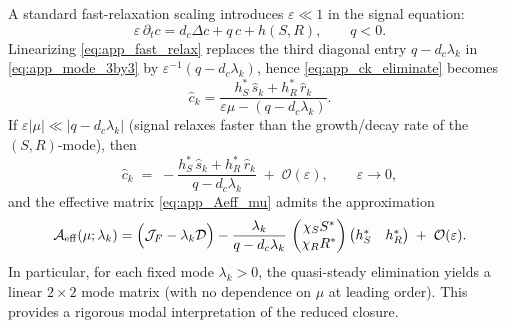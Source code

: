 \documentclass[pdflatex,sn-mathphys-ay]{sn-jnl}
\theoremstyle{thmstyleone}
\theoremstyle{definition}
\theoremstyle{remark}
\begin{document}
A standard fast-relaxation scaling introduces $\varepsilon\ll 1$ in the signal equation:
\begin{equation}
\label{eq:app_fast_relax}
\varepsilon\,\partial_t c = d_c\Delta c + q\,c + h(S,R),\qquad q<0.
\end{equation}
Linearizing \eqref{eq:app_fast_relax} replaces the third diagonal entry $q-d_c\lambda_k$ in \eqref{eq:app_mode_3by3} by
$\varepsilon^{-1}(q-d_c\lambda_k)$, hence \eqref{eq:app_ck_eliminate} becomes
\begin{equation}
\label{eq:app_ck_fast}
\hat c_k = \frac{h_S^*\,\hat s_k + h_R^*\,\hat r_k}{\varepsilon\mu-(q-d_c\lambda_k)}.
\end{equation}
If $\varepsilon|\mu|\ll |q-d_c\lambda_k|$ (signal relaxes faster than the growth/decay rate of the $(S,R)$-mode),
then
\begin{equation}
\label{eq:app_ck_qss}
\hat c_k \;=\; -\frac{h_S^*\,\hat s_k + h_R^*\,\hat r_k}{q-d_c\lambda_k}\;+\;\mathcal{O}(\varepsilon),
\qquad \varepsilon\to0,
\end{equation}
and the effective matrix \eqref{eq:app_Aeff_mu} admits the approximation
\begin{equation}
\label{eq:app_Aeff_qss}
\mathcal{A}_{\mathrm{eff}}(\mu;\lambda_k)
=
\Bigl(\mathcal{J}_F-\lambda_k \mathcal{D}\Bigr)
-\frac{\lambda_k}{q-d_c\lambda_k}\,
\begin{pmatrix}
\chi_S S^*\\ \chi_R R^*
\end{pmatrix}
\begin{pmatrix}
h_S^* & h_R^*
\end{pmatrix}
\;+\;\mathcal{O}(\varepsilon).
\end{equation}
In particular, for each fixed mode $\lambda_k>0$, the quasi-steady elimination yields a linear $2\times2$ mode matrix
(with no dependence on $\mu$ at leading order). This provides a rigorous modal interpretation of the reduced closure.
\end{document}
